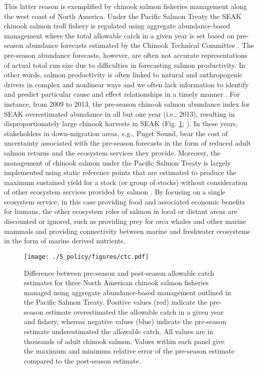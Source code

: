 This latter reason is exemplified by chinook salmon fisheries management along
the west coast of North America. Under the Pacific Salmon Treaty the SEAK
chinook salmon troll fishery is regulated using aggregate abundance-based
management where the total allowable catch in a given year is set based on
pre-season abundance forecasts estimated by the Chinook Technical Committee
\citep[Annex IV, Chapter 3, Section 6]{PST2014}. The pre-season
abundance forecasts, however, are often not accurate representations of actual
total run size due to difficulties in forecasting salmon productivity. In other
words, salmon productivity is often linked to natural and anthropogenic drivers
in complex and nonlinear ways and we often lack information to identify and
predict particular cause and effect relationships in a timely manner
\citep{Peterman2012, Malick2016a, Myers1998b}. For instance, from 2009 to 2013,
the pre-season chinook salmon abundance index for SEAK overestimated abundance
in all but one year (i.e., 2013), resulting in disproportionately large chinook
harvests in SEAK (Fig. \ref{fig:ebm:2}; \citealp{CTC2015a}). In these years,
stakeholders in down-migration areas, e.g., Puget Sound, bear the cost of
uncertainty associated with the pre-season forecasts in the form of reduced
adult salmon returns and the ecosystem services they provide. Moreover, the
management of chinook salmon under the Pacific Salmon Treaty is largely
implemented using static reference points that are estimated to produce the
maximum sustained yield for a stock (or group of stocks) without consideration
of other ecosystem services provided by salmon \citep{CTC2015b}. By focusing on
a single ecosystem service, in this case providing food and associated economic
benefits for humans, the other ecosystem roles of salmon in local or distant
areas are discounted or ignored, such as providing prey for orca whales and
other marine mammals and providing connectivity between marine and freshwater
ecosystems in the form of marine derived nutrients.

\begin{figure}[htbp]
  \centering \texttt{[image: ./5\_policy/figures/ctc.pdf]}
  \caption[Difference between pre-season and post-season allowable catch
           estimates for three North American chinook salmon
           fisheries]{Difference between pre-season and post-season allowable
           catch estimates for three North American chinook salmon fisheries
           managed using aggregate abundance-based management outlined in the
           Pacific Salmon Treaty. Positive values (red) indicate the pre-season
           estimate overestimated the allowable catch in a given year and
           fishery, whereas negative values (blue) indicate the pre-season
           estimate underestimated the allowable catch. All values are in
           thousands of adult chinook salmon. Values within each panel give the
           maximum and minimum relative error of the pre-season estimate
           compared to the post-season estimate.}
  \label{fig:ebm:2}
\end{figure}

